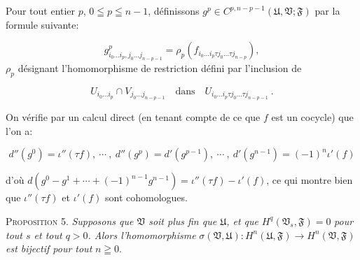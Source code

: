 %
%
%
%
Pour tout entier $p$, $0 \leqq p \leqq n - 1$, définissons $g^p \in C^{p, n-p-1}(\mathfrak{U}, \mathfrak{V}; \mathfrak{F})$ par la formule suivante:

\begin{equation*}
g^p_{i_0 \ldots i_p , j_0 \ldots j_{n-p-1}} = \rho_p(f_{i_0 \ldots i_p \tau j_0 \ldots \tau j_{n-p}}),
\end{equation*}
$\rho_p$ désignant l'homomorphisme de restriction défini par l'inclusion de

\begin{equation*}
U_{i_0 \ldots i_p} \cap V_{j_0 \ldots j_{n-p-1}} \quad \text{dans} \quad U_{i_0 \ldots i_p \tau j_0 \ldots \tau j_{n-p-1}} \ .
\end{equation*}

On vérifie par un calcul direct (en tenant compte de ce que $f$ est un cocycle) que l'on a:

\begin{equation*}
d''(g^0) = \iota''(\tau f), \ \cdots \ , \ d''(g^p) = d'(g^{p-1}), \ \cdots \ , \ d'(g^{n-1}) = (-1)^n \iota'(f)
\end{equation*}

d'où $d(g^0 - g^1 + \cdots + (-1)^{n-1} g^{n-1}) = \iota''(\tau f) - \iota'(f)$, ce qui montre bien que $\iota''(\tau f)$ et $\iota'(f)$ sont cohomologues.

\textsc{Proposition} 5. \textit{Supposons que $\mathfrak{V}$ soit plus fin que $\mathfrak{U}$, et que} $H^q(\mathfrak{V}_s , \mathfrak{F}) = 0$ \textit{pour tout $s$ et tout $q > 0$. Alors l'homomorphisme} $\sigma(\mathfrak{V}, \mathfrak{U}): H^n(\mathfrak{U}, \mathfrak{F}) \rightarrow H^n(\mathfrak{V}, \mathfrak{F})$ \textit{est bijectif pour tout} $n \geqq 0$.

